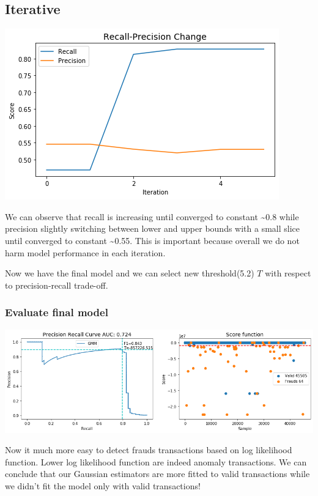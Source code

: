 \documentclass[20pt,a4paper]{article}
\begin{document}
\subsection{Iterative}
\begin{center}
\includegraphics[scale=0.45]{graphs/output_52_0.png}
\end{center}
 We can observe that recall is increasing until converged to constant \textasciitilde{}0.8 while precision slightly switching between lower and upper bounds with a small slice until converged to constant \textasciitilde{}0.55. This is important because overall we do not harm model performance in each iteration. 
 
 Now we have the final model and we can select new threshold(5.2) $T$ with respect to precision-recall trade-off.

\subsubsection{Evaluate final model}

\begin{center}
\includegraphics[scale=0.45]{graphs/output_55_0.png}
\end{center}
    
    Now it much more easy to detect frauds transactions based on log
likelihood function. Lower log likelihood function are indeed anomaly
transactions. We can conclude that our Gaussian estimators are more
fitted to valid transactions while we didn't fit the model only with
valid transactions!
\end{document}
